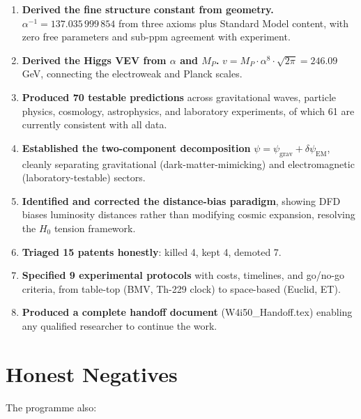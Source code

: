 \documentclass[11pt,a4paper]{article}
\begin{document}
\begin{enumerate}
\item \textbf{Derived the fine structure constant from geometry.} $\alpha^{-1} = 137.035\,999\,854$ from three axioms plus Standard Model content, with zero free parameters and sub-ppm agreement with experiment.

\item \textbf{Derived the Higgs VEV from $\alpha$ and $M_P$.} $v = M_P \cdot \alpha^8 \cdot \sqrt{2\pi} = 246.09$ GeV, connecting the electroweak and Planck scales.

\item \textbf{Produced 70 testable predictions} across gravitational waves, particle physics, cosmology, astrophysics, and laboratory experiments, of which 61 are currently consistent with all data.

\item \textbf{Established the two-component decomposition} $\psi = \psi_\text{grav} + \delta\psi_\text{EM}$, cleanly separating gravitational (dark-matter-mimicking) and electromagnetic (laboratory-testable) sectors.

\item \textbf{Identified and corrected the distance-bias paradigm}, showing DFD biases luminosity distances rather than modifying cosmic expansion, resolving the $H_0$ tension framework.

\item \textbf{Triaged 15 patents honestly}: killed 4, kept 4, demoted 7.

\item \textbf{Specified 9 experimental protocols} with costs, timelines, and go/no-go criteria, from table-top (BMV, Th-229 clock) to space-based (Euclid, ET).

\item \textbf{Produced a complete handoff document} (W4i50\_Handoff.tex) enabling any qualified researcher to continue the work.
\end{enumerate}


\section{Honest Negatives}

The programme also:
\end{document}
